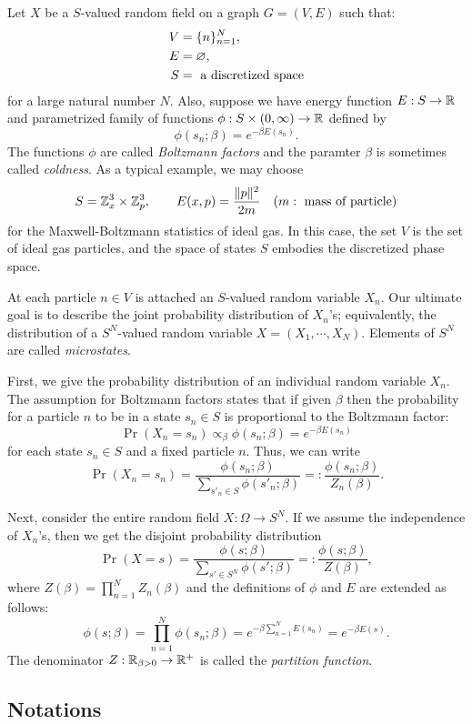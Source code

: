 \documentclass{../exp}
\begin{document}
\begin{ex}
Let $X$ be a $S$-valued random field on a graph $G=(V,E)$ such that:
\begin{align*}
V&=\{n\}_{n=1}^N,\\
E&=\varnothing,\\
S&=\text{ a discretized space}
\end{align*}
for a large natural number $N$.
Also, suppose we have energy function $E:S\to\R$ and parametrized family of functions $\phi:S\times(0,\infty)\to\R$ defined by
\[\phi(s_n;\beta)=e^{-\beta E(s_n)}.\]
The functions $\phi$ are called \emph{Boltzmann factors} and the paramter $\beta$ is sometimes called \emph{coldness}.
As a typical example, we may choose
\[S=\mathbb{Z}_x^3\times\mathbb{Z}_p^3,\qquad E(x,p)=\frac{\|p\|^2}{2m}\quad(m:\text{ mass of particle})\]
for the Maxwell-Boltzmann statistics of ideal gas.
In this case, the set $V$ is the set of ideal gas particles, and the space of states $S$ embodies the discretized phase space.

At each particle $n\in V$ is attached an $S$-valued random variable $X_n$.
Our ultimate goal is to describe the joint probability distribution of $X_n$'s; equivalently, the distribution of a $S^N$-valued random variable $X=(X_1,\cdots,X_N)$.
Elements of $S^N$ are called \emph{microstates}.

First, we give the probability distribution of an individual random variable $X_n$.
The assumption for Boltzmann factors states that if given $\beta$ then the probability for a particle $n$ to be in a state $s_n\in S$ is proportional to the Boltzmann factor: 
\[\Pr(X_n=s_n)\propto_\beta\phi(s_n;\beta)=e^{-\beta E(s_n)}\]
for each state $s_n\in S$ and a fixed particle $n$.
Thus, we can write
\[\Pr(X_n=s_n)=\frac{\phi(s_n;\beta)}{\sum_{s'_n\in S}\phi(s'_n;\beta)}=:\frac{\phi(s_n;\beta)}{Z_n(\beta)}.\]

Next, consider the entire random field $X:\Omega\to S^N$.
If we assume the independence of $X_n$'s, then we get the disjoint probability distribution
\[\Pr(X=s)=\frac{\phi(s;\beta)}{\sum_{s'\in S^N}\phi(s';\beta)}=:\frac{\phi(s;\beta)}{Z(\beta)},\]
where $Z(\beta)=\prod_{n=1}^NZ_n(\beta)$ and the definitions of $\phi$ and $E$ are extended as follows:
\[\phi(s;\beta)=\prod_{n=1}^N\phi(s_n;\beta)=e^{-\beta\sum_{n=1}^NE(s_n)}=e^{-\beta E(s)}.\]
The denominator $Z:\R_{\beta>0}\to\R^+$ is called the \emph{partition function}.
\end{ex}


\subsection{Notations}
\end{document}
